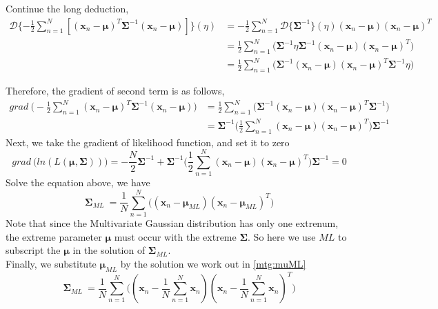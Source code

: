 \documentclass[11pt,a4paper]{article}
\newcommand{\htab}{\hspace*{0.63cm}}
\newcommand{\dd}[2]{\mathcal{D}\{ #1 \} (#2)}
\newcommand{\bmu}{\boldsymbol{\mu}}
\newcommand{\bsum}{\boldsymbol{\Sigma}}
\newcommand{\xnv}{\boldsymbol{x}_{n} }
\begin{document}
\htab Continue the long deduction,
    \begin{align}
        \dd{-\frac{1}{2} \sum_{n=1}^{N} [ (\xnv-\bmu)^{T} \bsum^{-1} (\xnv-\bmu)]}{\eta}
        & = -\frac{1}{2} \sum_{n=1}^{N} \dd{  \bsum^{-1}}{\eta} (\xnv-\bmu) (\xnv-\bmu)^{T} \\
        & = \frac{1}{2} \sum_{n=1}^{N} \Big( \bsum^{-1} \eta \bsum^{-1} (\xnv-\bmu) (\xnv-\bmu)^{T} \Big) \\ 
        & = \frac{1}{2} \sum_{n=1}^{N} \Big(  \bsum^{-1} (\xnv-\bmu) (\xnv-\bmu)^{T} \bsum^{-1} \eta \Big) 
        \label{mtg:etasymmetry}
    \end{align}

\htab Therefore, the gradient of second term is as follows,
    \begin{align}
         grad \ \Big( -\frac{1}{2} \sum_{n=1}^{N}  (\xnv-\bmu)^{T} \bsum^{-1} (\xnv-\bmu) \Big) 
        &    = \frac{1}{2} \sum_{n=1}^{N} \big( \bsum^{-1} (\xnv-\bmu) (\xnv-\bmu)^{T} \bsum^{-1} \big) \\
        &   = \bsum^{-1} \Big( \frac{1}{2} \sum_{n=1}^{N}  (\xnv-\bmu) (\xnv-\bmu)^{T}  \Big) \bsum^{-1}
    \end{align}
\htab Next, we take the gradient of likelihood function, and set it to zero
    \begin{equation}
        grad \ \Big( ln(L(\bmu,\bsum))\Big) = -\frac{N}{2} \bsum^{-1} +
         \bsum^{-1} \Big( \frac{1}{2} \sum_{n=1}^{N}  (\xnv-\bmu) (\xnv-\bmu)^{T}  \Big) \bsum^{-1} = 0
    \end{equation}
\htab Solve the equation above, we have
    \begin{equation}
    \bsum_{ML} \
        = \frac{1}{N}  \sum_{n=1}^{N} \Big( (\xnv - \bmu_{ML})  (\xnv - \bmu_{ML})^{T} \Big)
    \end{equation}
\htab Note that since the Multivariate Gaussian distribution has only one extrenum, the extreme parameter $\bmu$ must occur with the extreme $\bsum$. So here we use $ML$ to subscript the $\bmu$ in the solution of $\bsum_{ML}$.\\
\htab Finally, we substitute $\bmu_{ML}$ by the solution we work out in \eqref{mtg:muML}
\begin{equation}  \label{mtg:sumML}
        \bsum_{ML} \
        = \frac{1}{N}  \sum_{n=1}^{N} \Big( (\xnv - \frac{1}{N} \sum_{n=1}^{N} \xnv)
        (\xnv - \frac{1}{N} \sum_{n=1}^{N} \xnv)^{T} \Big)
    \end{equation}
\newpage
\end{document}
